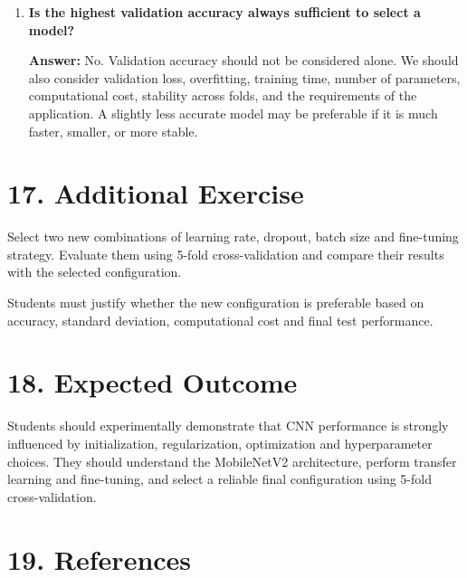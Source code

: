 \documentclass[10pt]{article}
\begin{document}
\begin{enumerate}
\item \textbf{Is the highest validation accuracy always sufficient to select a model?}

\textbf{Answer:} No. Validation accuracy should not be considered alone. We should also consider validation loss, overfitting, training time, number of parameters, computational cost, stability across folds, and the requirements of the application. A slightly less accurate model may be preferable if it is much faster, smaller, or more stable.

\end{enumerate}

\section*{17. Additional Exercise}

Select two new combinations of learning rate, dropout, batch size and
fine-tuning strategy. Evaluate them using 5-fold cross-validation and
compare their results with the selected configuration.

Students must justify whether the new configuration is preferable based
on accuracy, standard deviation, computational cost and final test
performance.

\section*{18. Expected Outcome}

Students should experimentally demonstrate that CNN performance is
strongly influenced by initialization, regularization, optimization and
hyperparameter choices. They should understand the MobileNetV2 architecture,
perform transfer learning and fine-tuning, and select a reliable final
configuration using 5-fold cross-validation.

\section*{19. References}
\end{document}
